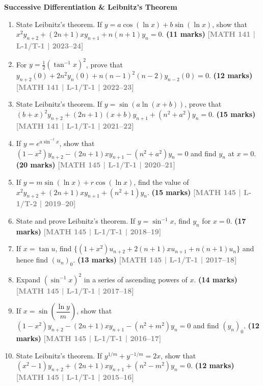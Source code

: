 \documentclass[12pt,a4paper]{article}
\newcommand{\yr}[1]{\hfill\textcolor{gray}{\small\textbf{[#1]}}}
\newcommand{\mk}[1]{\textcolor{orange!70!black}{\small\textbf{(#1 marks)}}}
\newcommand{\subtopic}[2]{%
  \vspace{10pt}
  \noindent\begin{tcolorbox}[colback=#1!8,colframe=#1,boxrule=0.6pt,arc=4pt,
    left=6pt,right=6pt,top=4pt,bottom=4pt]
    \small\bfseries\textcolor{#1}{#2}
  \end{tcolorbox}
  \vspace{2pt}
}
\begin{document}
\subtopic{cA}{Successive Differentiation \& Leibnitz's Theorem}
\label{sub:s1-succ}

\begin{enumerate}\item State Leibnitz's theorem. If $y=a\cos(\ln x)+b\sin(\ln x)$, show that $x^{2}y_{n+2}+(2n+1)xy_{n+1}+n(n+1)y_{n}=0$.
\mk{11} \yr{MATH 141 | L-1/T-1 | 2023--24}

\item For $y=\tfrac{1}{2}(\tan^{-1}x)^{2}$, prove that $y_{n+2}(0)+2n^{2}y_{n}(0)+n(n-1)^{2}(n-2)y_{n-2}(0)=0$.
\mk{12} \yr{MATH 141 | L-1/T-1 | 2022--23}



\item State Leibnitz's theorem. If $y=\sin(a\ln(x+b))$, prove that $(b+x)^{2}y_{n+2}+(2n+1)(x+b)y_{n+1}+(n^{2}+a^{2})y_{n}=0$.
\mk{15} \yr{MATH 141 | L-1/T-1 | 2021--22}

\item If $y=e^{a\sin^{-1}x}$, show that $(1-x^{2})y_{n+2}-(2n+1)xy_{n+1}-(n^{2}+a^{2})y_{n}=0$ and find $y_{n}$ at $x=0$.
\mk{20} \yr{MATH 145 | L-1/T-1 | 2020--21}

\item If $y=m\sin(\ln x)+r\cos(\ln x)$, find the value of $x^{2}y_{n+2}+(2n+1)xy_{n+1}+(n^{2}+1)y_{n}$.
\mk{15} \yr{MATH 145 | L-1/T-2 | 2019--20}

\item State and prove Leibnitz's theorem. If $y=\sin^{-1}x$, find $y_{n}$ for $x=0$.
\mk{17} \yr{MATH 145 | L-1/T-1 | 2018--19}

\item If $x=\tan u$, find $\{(1+x^{2})u_{n+2}+2(n+1)xu_{n+1}+n(n+1)u_{n}\}$ and hence find $(u_{n})_{0}$.
\mk{13} \yr{MATH 145 | L-1/T-1 | 2017--18}

\item Expand $(\sin^{-1}x)^{2}$ in a series of ascending powers of $x$.
\mk{14} \yr{MATH 145 | L-1/T-1 | 2017--18}

\item If $x=\sin\!\left(\dfrac{\ln y}{m}\right)$, show that $(1-x^{2})y_{n+2}-(2n+1)xy_{n+1}-(n^{2}+m^{2})y_{n}=0$ and find $(y_{n})_{0}$.
\mk{12} \yr{MATH 145 | L-1/T-1 | 2016--17}

\item State Leibnitz's theorem. If $y^{1/m}+y^{-1/m}=2x$, show that $(x^{2}-1)y_{n+2}+(2n+1)xy_{n+1}+(n^{2}-m^{2})y_{n}=0$.
\mk{12} \yr{MATH 145 | L-1/T-1 | 2015--16}


\end{enumerate}
\end{document}
